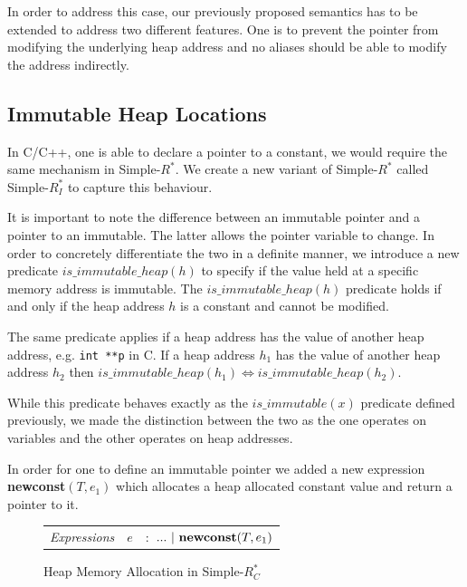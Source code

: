 \documentclass[a4paper,12pt]{report}
\begin{document}
\par
In order to address this case, our previously proposed semantics has to be 
extended to address two different features. One is to prevent the pointer from 
modifying the underlying heap address and no aliases should be able to modify 
the address indirectly.

\subsection{Immutable Heap Locations}
In C/C++, one is able to declare a pointer to a constant, we would require 
the same mechanism in Simple-$R^{*}$. We create a new variant of Simple-$R^{*}$ 
called Simple-$R^{*}_{I}$ to capture this behaviour. 

\par
It is important to note the 
difference between an immutable pointer and a pointer 
to an immutable. The latter allows the pointer variable to change. In order to 
concretely differentiate the two in a definite manner, we introduce 
a new predicate $is\_immutable\_heap(h)$ to specify if the value held at a 
specific memory address is immutable. The $is\_immutable\_heap(h)$ predicate 
holds if and only if the heap address $h$ is a constant and cannot be modified.

\par 
The same predicate applies if a heap address has the value of 
another heap address, e.g. \verb|int **p| in C. If a heap address $h_1$ has the 
value of another heap address $h_2$ then $is\_immutable\_heap(h_1) \Leftrightarrow 
is\_immutable\_heap(h_2)$.  

\par
While this predicate behaves exactly as the $is\_immutable(x)$ predicate defined 
previously, we made the distinction between the two as the one operates on variables 
and the other operates on heap addresses. 

\par
In order for one to define an immutable pointer we added a new expression 
\textbf{newconst}$(T, e_1)$ which allocates a heap allocated constant value and 
return a pointer to it. 

\begin{figure}[H]
  \begin{center}
    \begin{tabular} {l l l}      
      \textit{Expressions} & $e$& $:$ $...\text{ }|\text{ \textbf{newconst}}(T, e_1)$ \\
    \end{tabular}
  \end{center}
  \caption{Heap Memory Allocation in Simple-$R^{*}_{C}$}
\end{figure}
\end{document}
